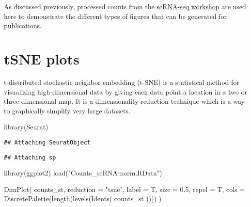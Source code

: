 \documentclass[
  openany]{book}
\newenvironment{Shaded}{\begin{snugshade}}{\end{snugshade}}
\newcommand{\AttributeTok}[1]{\textcolor[rgb]{0.77,0.63,0.00}{#1}}
\newcommand{\FloatTok}[1]{\textcolor[rgb]{0.00,0.00,0.81}{#1}}
\newcommand{\FunctionTok}[1]{\textcolor[rgb]{0.00,0.00,0.00}{#1}}
\newcommand{\NormalTok}[1]{#1}
\newcommand{\StringTok}[1]{\textcolor[rgb]{0.31,0.60,0.02}{#1}}
\begin{document}
As discussed previously, processed counts from the \href{https://chisangad.github.io/scRNAseqtut/index.html}{scRNA-seq workshop} are used here to demonstrate the different types of figures that can be generated for publications.

\hypertarget{tsne-plots}{%
\section{tSNE plots}\label{tsne-plots}}

t-distributed stochastic neighbor embedding (t-SNE) is a statistical method for visualizing high-dimensional data by giving each data point a location in a two or three-dimensional map. It is a dimensionality reduction technique which is a way to graphically simplify very large datasets.

\begin{Shaded}
\begin{Highlighting}[]
\FunctionTok{library}\NormalTok{(Seurat)}
\end{Highlighting}
\end{Shaded}

\begin{verbatim}
## Attaching SeuratObject
\end{verbatim}

\begin{verbatim}
## Attaching sp
\end{verbatim}

\begin{Shaded}
\begin{Highlighting}[]
\FunctionTok{library}\NormalTok{(ggplot2)}
\FunctionTok{load}\NormalTok{(}\StringTok{"Counts\_scRNA{-}norm.RData"}\NormalTok{)}
\end{Highlighting}
\end{Shaded}

\begin{Shaded}
\begin{Highlighting}[]
\FunctionTok{DimPlot}\NormalTok{(}
\NormalTok{  counts\_st,}
  \AttributeTok{reduction =} \StringTok{"tsne"}\NormalTok{,}
  \AttributeTok{label =}\NormalTok{ T,}
  \AttributeTok{size =} \FloatTok{0.5}\NormalTok{,}
  \AttributeTok{repel =}\NormalTok{ T,}
  \AttributeTok{cols =} \FunctionTok{DiscretePalette}\NormalTok{(}\FunctionTok{length}\NormalTok{(}\FunctionTok{levels}\NormalTok{(}\FunctionTok{Idents}\NormalTok{(}
\NormalTok{    counts\_st}
\NormalTok{  ))))}
\NormalTok{)}
\end{Highlighting}
\end{Shaded}
\end{document}
